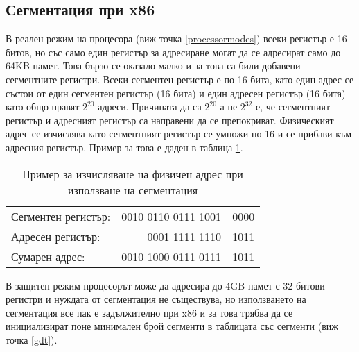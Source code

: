   \subsection{Сегментация при x86} \label{segmentation}
  В реален режим на процесора (виж точка \ref{processormodes}) всеки регистър е 16-битов, но със само един регистър за адресиране могат да се адресират само до 64KB памет. Това бързо се оказало малко и за това са били добавени сегментните регистри. Всеки сегментен регистър е по 16 бита, като един адрес се състои от един сегментен регистър (16 бита) и един адресен регистър (16 бита) като общо правят $2^{20}$ адреси. Причината да са $2^{20}$ а не $2^{32}$ е, че сегментният регистър и адресният регистър са направени да се препокриват. Физическият адрес се изчислява като сегментният регистър се умножи по 16 и се прибави към адресния регистър. Пример за това е даден в таблица \ref{tab:segmentation-calculation}.
  \begin{table}[htpb]
    \centering
    \begin{tabular}{l r@{\hskip 3pt}l}
      Сегментен регистър: & 0010 0110 0111 1001 & \color{gray}0000 \\
      Адресен регистър: & 0001 1111 1110 & 1011 \\
      \hline
      Сумарен адрес: & 0010 1000 0111 0111 & 1011 \\
    \end{tabular}
    \caption{Пример за изчисляване на физичен адрес при използване на сегментация}
    \label{tab:segmentation-calculation}
  \end{table}

  В защитен режим процесорът може да адресира до 4GB памет с 32-битови регистри и нуждата от сегментация не съществува, но използването на сегментация все пак е задължително при x86 и за това трябва да се инициализират поне минимален брой сегменти в таблицата със сегменти (виж точка \ref{gdt}).


